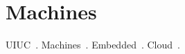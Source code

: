 \section{Machines}
\label{sec:machines}

UIUC~\cite{sep+09}.
Machines~\cite{ibs12,kl10,kdh+06,tl10,whk+13}.
Embedded~\cite{rpm+15}.
Cloud~\cite{pcc14}.
